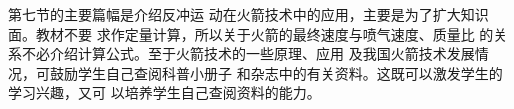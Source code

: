 第七节的主要篇幅是介绍反冲运
动在火箭技术中的应用，主要是为了扩大知识面。教材不要
求作定量计算，所以关于火箭的最终速度与喷气速度、质量比
的关系不必介绍计算公式。至于火箭技术的一些原理、应用
及我国火箭技术发展情况，可鼓励学生自己查阅科普小册子
和杂志中的有关资料。这既可以激发学生的学习兴趣，又可
以培养学生自己查阅资料的能力。












































































































